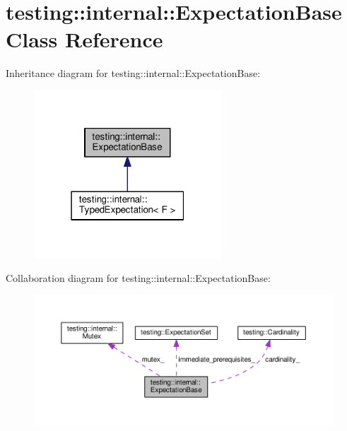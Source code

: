 \hypertarget{classtesting_1_1internal_1_1ExpectationBase}{}\section{testing\+:\+:internal\+:\+:Expectation\+Base Class Reference}
\label{classtesting_1_1internal_1_1ExpectationBase}


Inheritance diagram for testing\+:\+:internal\+:\+:Expectation\+Base\+:\nopagebreak
\begin{figure}[H]
\begin{center}
\leavevmode
\includegraphics[width=199pt]{classtesting_1_1internal_1_1ExpectationBase__inherit__graph}
\end{center}
\end{figure}


Collaboration diagram for testing\+:\+:internal\+:\+:Expectation\+Base\+:\nopagebreak
\begin{figure}[H]
\begin{center}
\leavevmode
\includegraphics[width=350pt]{classtesting_1_1internal_1_1ExpectationBase__coll__graph}
\end{center}
\end{figure}
